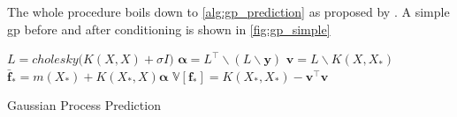 The whole procedure boils down to \cref{alg:gp_prediction} as proposed by \cite{rasmussen}. A simple \acrshort{gp} before and after conditioning is shown in \cref{fig:gp_simple}

\begin{algorithm}[H]
\begin{algorithmic}[1]
    \State $L = cholesky\big(K(X, X) + \sigma I\big)$
    \State $\boldsymbol{\alpha} = L^\intercal \backslash (L \backslash \boldsymbol{y})$
    \State $\boldsymbol{v} = L \backslash K(X, X_*)$
    \State $\bar{\boldsymbol{f}}_* = m(X_*) + K(X_*, X) \boldsymbol{\alpha}$
    \State $\mathbb{V}[\boldsymbol{f}_*] = K(X_*, X_*) - \boldsymbol{v}^\intercal \boldsymbol{v}$
\EndProcedure
\end{algorithmic}
\caption{Gaussian Process Prediction}
\label{alg:gp_prediction}
\end{algorithm}


